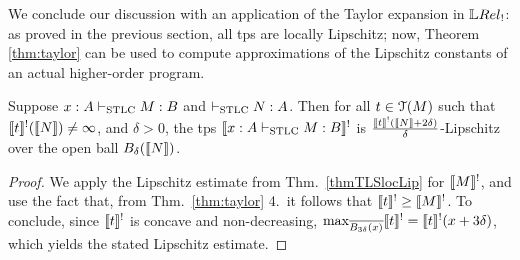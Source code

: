 %
%
%


We conclude our discussion with an application of the Taylor expansion in $\LREL_{!}$: as proved in the previous section, all tps are locally Lipschitz; now, Theorem \ref{thm:taylor} can be used to compute approximations of the Lipschitz constants of an actual higher-order program.

\begin{corollary}
Suppose $x: A \vdash_{\mathrm{STLC}}M:B$ and $\vdash_{\mathrm{STLC}} N:A$. 
Then for all $t\in \mathcal{T}(M)$ such that $\llbracket t\rrbracket^{!}(\llbracket N\rrbracket)\neq \infty$, and $\delta>0$, the tps $\llbracket x:A\vdash_{\mathrm{STLC}}M:B\rrbracket^{!}$ is $\frac{\llbracket t\rrbracket^{!}(\llbracket N\rrbracket+2\delta)}{\delta}$-Lipschitz over the open ball
 $B_{\delta}(\llbracket N\rrbracket)$.
\end{corollary}
\begin{proof}
We apply the Lipschitz estimate from Thm.~\ref{thmTLSlocLip} for $\llbracket M\rrbracket^{!}$,  and use the fact that, from Thm.~\ref{thm:taylor} 4.~it follows that $\llbracket t\rrbracket^{!}\geq \llbracket M\rrbracket^{!}$.
To conclude, since $\llbracket t\rrbracket^{!}$ is concave and non-decreasing, $\max_{\overline{B_{3\delta}(x)}}\llbracket t\rrbracket^{!}= \llbracket t\rrbracket^{!}(x+3\delta)$, which yields the stated Lipschitz estimate. 
\end{proof}

